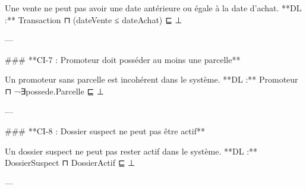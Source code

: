 Une vente ne peut pas avoir une date antérieure ou égale à la date d’achat.
**DL :**
Transaction ⊓ (dateVente ≤ dateAchat) ⊑ ⊥

---

### **CI-7 : Promoteur doit posséder au moins une parcelle**

Un promoteur sans parcelle est incohérent dans le système.
**DL :**
Promoteur ⊓ ¬∃possede.Parcelle ⊑ ⊥

---

### **CI-8 : Dossier suspect ne peut pas être actif**

Un dossier suspect ne peut pas rester actif dans le système.
**DL :**
DossierSuspect ⊓ DossierActif ⊑ ⊥

---

